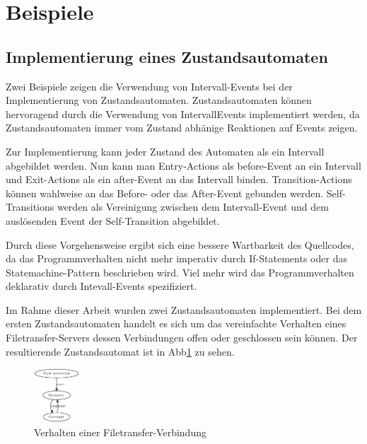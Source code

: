 \section{Beispiele}
\subsection{Implementierung eines Zustandsautomaten}
Zwei Beispiele zeigen die Verwendung von Intervall-Events bei der
Implementierung von Zustandsautomaten. Zustandsautomaten können hervoragend
durch die Verwendung von IntervallEvents implementiert werden, da
Zustandsautomaten immer vom Zustand abhänige Reaktionen auf Events zeigen.

Zur Implementierung kann jeder Zustand des Automaten als ein Intervall
abgebildet werden. Nun kann man Entry-Actions als before-Event an ein Intervall
und Exit-Actions als ein after-Event an das Intervall binden. Transition-Actions
können wahlweise an das Before- oder das After-Event gebunden werden.
Self-Transitions werden als Vereinigung zwischen dem Intervall-Event und dem
auslösenden Event der Self-Transition abgebildet. 

Durch diese Vorgehensweise ergibt sich eine bessere Wartbarkeit des
Quellcodes, da das Programmverhalten nicht mehr imperativ durch If-Statements
oder das Statemachine-Pattern beschrieben wird. Viel mehr wird das
Programmverhalten deklarativ durch Intevall-Events spezifiziert.

Im Rahme dieser Arbeit wurden zwei Zustandsautomaten implementiert. Bei dem
ersten Zustandsautomaten handelt es sich um das vereinfachte Verhalten eines
Filetransfer-Servers dessen Verbindungen offen oder geschlossen sein können. Der
resultierende Zustandsautomat ist in Abb\ref{filetransfer_behaviour} zu sehen.

\begin{figure}[htp]
\begin{center}
  \includegraphics[width=0.15\textwidth]{./graphics/tcp_stm.dot.eps}
  \caption[labelInTOC]{Verhalten einer Filetransfer-Verbindung}
  \label{filetransfer_behaviour}
\end{center}
\end{figure}

